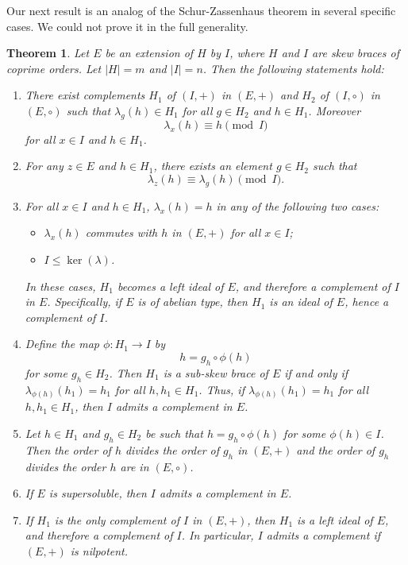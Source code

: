 \documentclass[11pt]{amsart}
\theoremstyle{thrm}
\theoremstyle{plain}
\newtheorem{thm}{Theorem}[section]
\theoremstyle{definition}
\numberwithin{equation}{section}
\begin{document}
Our next result is an analog of the Schur-Zassenhaus theorem in several specific cases. We could not prove it in the full generality.

\begin{thm}\label{main7}
	Let $E$ be an extension of $H$ by $I$, where $H$ and $I$ are skew braces of coprime orders.  
	Let $|H| = m$ and $|I| = n$. Then the following statements hold:
	
	\begin{enumerate}
		\item There exist complements $H_1$ of $(I,+)$ in $(E,+)$ and $H_2$ of $(I,\circ)$ in $(E,\circ)$ such that 
		$\lambda_g(h) \in H_1$ for all $g \in H_2$ and $h \in H_1$. Moreover
		\[
		\lambda_x(h) \equiv h \pmod{I}
		\]
	for all  $x \in I$ and $h \in H_1$. 
	
	\item  For any $z \in E$ and $h \in H_1$, there exists an element $g \in H_2$ such that 
		\[
		\lambda_{z}(h) \equiv \lambda_{g}(h) \pmod{I}.
		\]
		
	\item For all $x \in I$ and $h \in H_1$,  $\lambda_x(h) = h$  in any of the following two cases:
	\begin{itemize}
		\item[(i)] $\lambda_x(h)$ commutes with $h$ in $(E, +)$ for all $x \in I$;
		\item[(ii)] $I \le \ker(\lambda)$.
	\end{itemize}
	In these cases, $H_1$ becomes a left ideal of $E$, and therefore a complement of $I$ in $E$. Specifically, if $E$ is of abelian type, then $H_1$ is an ideal of $E$, hence a complement of $I$.
	
	\item Define the map $\phi : H_1 \to I$ by 
	\[
	h = g_h \circ \phi(h)
	\]
	for some $g_h \in H_2$. Then $H_1$ is a sub-skew brace of $E$ if and only if $\lambda_{\phi(h)}(h_1) = h_1$ for all $h, h_1 \in H_1$. Thus,  if $\lambda_{\phi(h)}(h_1) = h_1$ for all $h, h_1 \in H_1$, then $I$ admits a complement in $E$.
	
	\item Let $h \in H_1$ and $g_h \in H_2$ be such that $h = g_h \circ \phi(h)$ for some $\phi(h) \in I$. Then the order of $h$ divides the order of $g_h$ in $(E, +)$ and  the order of $g_h$ divides the order $h$ are  in $(E, \circ)$.

\item If $E$ is supersoluble, then $I$ admits a complement in $E$.

\item If $H_1$ is the only complement of $I$ in $(E, +)$, then $H_1$ is a left ideal of $E$, and therefore a complement of $I$. In particular, $I$ admits a complement if $(E, +)$ is nilpotent.

\end{enumerate}
\end{thm}
\end{document}
